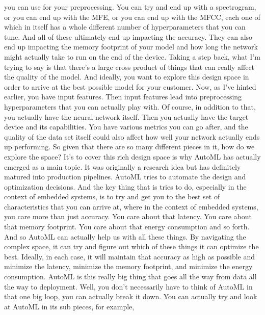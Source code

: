 {{{{    you can use for your preprocessing.
    You can try and end up with a spectrogram,
    or you can end up with the MFE, or you can end up with the MFCC,
    each one of which in itself has a whole different number of hyperparameters
    that you can tune.
    And all of these ultimately end up impacting the accuracy.
    They can also end up impacting the memory footprint of your model
    and how long the network might actually take to run on the end of the device.
    Taking a step back, what I'm trying to say
    is that there's a large cross product of things that can really
    affect the quality of the model.
    And ideally, you want to explore this design space in order
    to arrive at the best possible model for your customer.
    Now, as I've hinted earlier, you have input features.
    Then input features lead into preprocessing hyperparameters
    that you can actually play with.
    Of course, in addition to that, you actually
    have the neural network itself.
    Then you actually have the target device and its capabilities.
    You have various metrics you can go after, and the quality of the data
    set itself could also affect how well your network actually
    ends up performing.
    So given that there are so many different pieces in it,
    how do we explore the space?
    It's to cover this rich design space is why AutoML has actually
    emerged as a main topic.
    It was originally a research idea but has definitely
    matured into production pipelines.
    AutoML tries to automate the design and optimization decisions.
    And the key thing that is tries to do, especially
    in the context of embedded systems, is to try and get you
    to the best set of characteristics that you can arrive at,
    where in the context of embedded systems,
    you care more than just accuracy.
    You care about that latency.
    You care about that memory footprint.
    You care about that energy consumption and so forth.
    And so AutoML can actually help us with all these things.
    By navigating the complex space, it can try and figure out
    which of these things it can optimize the best.
    Ideally, in each case, it will maintain that accuracy as high as possible
    and minimize the latency, minimize the memory footprint,
    and minimize the energy consumption.
    AutoML is this really big thing that goes all the way
    from data all the way to deployment.
    Well, you don't necessarily have to think of AutoML in that one big loop,
    you can actually break it down.
    You can actually try and look at AutoML in its sub pieces, for example,
}}}}

